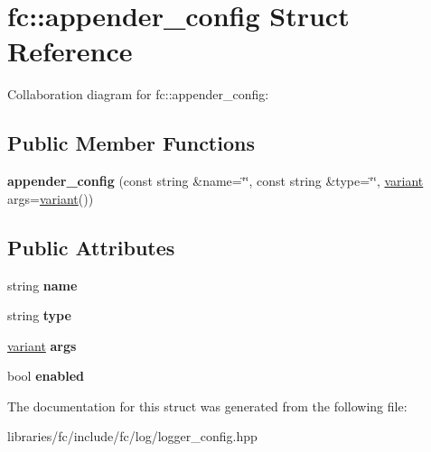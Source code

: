 \hypertarget{structfc_1_1appender__config}{}\section{fc\+:\+:appender\+\_\+config Struct Reference}
\label{structfc_1_1appender__config}


Collaboration diagram for fc\+:\+:appender\+\_\+config\+:
\subsection*{Public Member Functions}
\begin{DoxyCompactItemize}
\item 
\mbox{\label{structfc_1_1appender__config_ab0de6ecf978e99dca0fa194865a8d1e8}} 
{\bfseries appender\+\_\+config} (const string \&name=\char`\"{}\char`\"{}, const string \&type=\char`\"{}\char`\"{}, \mbox{\hyperlink{classfc_1_1variant}{variant}} args=\mbox{\hyperlink{classfc_1_1variant}{variant}}())
\end{DoxyCompactItemize}
\subsection*{Public Attributes}
\begin{DoxyCompactItemize}
\item 
\mbox{\label{structfc_1_1appender__config_ab6e6005660d615d49db98177f04f4f7a}} 
string {\bfseries name}
\item 
\mbox{\label{structfc_1_1appender__config_ad22616f12f05c133a2909b6faecd21c0}} 
string {\bfseries type}
\item 
\mbox{\label{structfc_1_1appender__config_a3bc8f520d2dd16cffab36a927006c74d}} 
\mbox{\hyperlink{classfc_1_1variant}{variant}} {\bfseries args}
\item 
\mbox{\label{structfc_1_1appender__config_a70395e864d00f37e4f44b73babbb539c}} 
bool {\bfseries enabled}
\end{DoxyCompactItemize}


The documentation for this struct was generated from the following file\+:\begin{DoxyCompactItemize}
\item 
libraries/fc/include/fc/log/logger\+\_\+config.\+hpp\end{DoxyCompactItemize}
